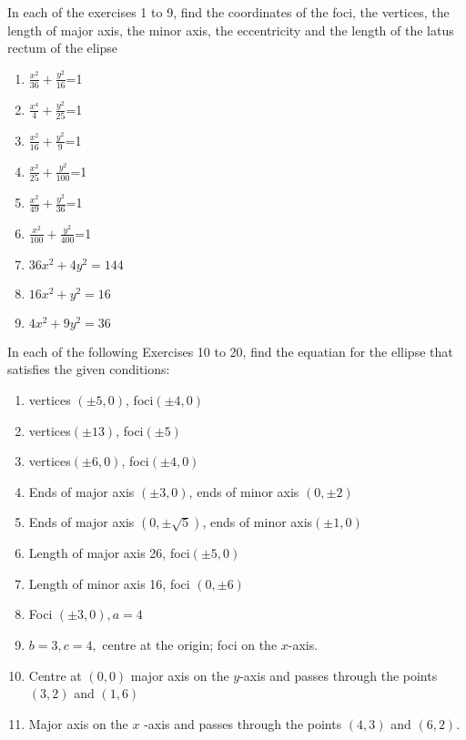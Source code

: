 In each of the exercises 1 to 9, find the coordinates of the foci, the vertices, the length of major axis, the minor axis, the eccentricity and the length of the latus rectum of the elipse
\begin{enumerate}[label=\thesection.\arabic*,ref=\thesection.\theenumi]

\item $\frac{x^2}{36}+\frac{y^2}{16}$=1
\item $\frac{x^4}{4}+\frac{y^2}{25}$=1
\item $\frac{x^2}{16}+\frac{y^2}{9}$=1
\item $\frac{x^2}{25}+\frac{y^2}{100}$=1
\item $\frac{x^2}{49}+\frac{y^2}{36}$=1
\item $\frac{x^2}{100}+\frac{y^2}{400}$=1
\item $36x^2+4y^2=144$
\item $16x^2+y^2=16$
\item $4x^2+9y^2=36$
\end{enumerate}
In each of the following  Exercises 10 to 20, find the equatian for the ellipse that satisfies the given conditions:
\begin{enumerate}[label=\thesection.\arabic*,ref=\thesection.\theenumi,resume*]
\item vertices $(\pm5,0)$, foci$(\pm4,0)$
\item vertices$(\pm13)$, foci$(\pm5)$
\item vertices$(\pm6,0)$, foci$(\pm4,0)$
\item Ends of major axis $(\pm3,0)$, ends of minor axis $(0,\pm2)$
\item Ends of major axis $(0,\pm\sqrt{5})$, ends of minor axis$(\pm1,0)$
\item Length of major axis 26, foci$(\pm5,0)$
\item Length of minor axis 16, foci $(0,\pm6)$
\item Foci $(\pm3,0), a=4$
\item $b=3, c=4,$ centre at the origin; foci on the $x$-axis.
\item  Centre at $(0,0)$ major axis on the $y$-axis and passes through the points $(3,2)$ and $(1,6)$
\item Major axis on the $x$ -axis and passes through the points $(4,3)$ and $(6,2)$.
\end{enumerate}
